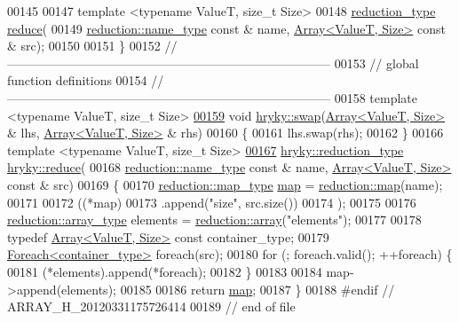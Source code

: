 \begin{DoxyCode}
00145 
00147     \textcolor{keyword}{template} <\textcolor{keyword}{typename} ValueT, \textcolor{keywordtype}{size\_t} Size>
00148     \hyperlink{classhryky_1_1_intrusive_ptr}{reduction_type} \hyperlink{namespacehryky_af41cb3af6766761da0ff21b84527a52c}{reduce}(
00149         \hyperlink{classhryky_1_1reduction_1_1_string}{reduction::name_type} \textcolor{keyword}{const} & name, \hyperlink{classhryky_1_1_array}{Array<ValueT, Size>} \textcolor{keyword}{const} & src);
00150 
00151 \}
00152 \textcolor{comment}{//
      ------------------------------------------------------------------------------}
00153 \textcolor{comment}{// global function definitions}
00154 \textcolor{comment}{//
      ------------------------------------------------------------------------------}
00158 \textcolor{comment}{}\textcolor{keyword}{template} <\textcolor{keyword}{typename} ValueT, \textcolor{keywordtype}{size\_t} Size>
\hypertarget{array_8h_source_l00159}{}\hyperlink{namespacehryky_a7bca9e1fce78881655d3c9e23dad3691}{00159} \textcolor{keywordtype}{void} \hyperlink{namespacehryky_a4282146df5ea2b68cb667896a2205909}{hryky::swap}(\hyperlink{classhryky_1_1_array}{Array<ValueT, Size>} & lhs, \hyperlink{classhryky_1_1_array}{Array<ValueT, Size>} & rhs)
00160 \{
00161     lhs.swap(rhs);
00162 \}
00166 \textcolor{keyword}{template} <\textcolor{keyword}{typename} ValueT, \textcolor{keywordtype}{size\_t} Size>
\hypertarget{array_8h_source_l00167}{}\hyperlink{namespacehryky_aa477737bab9053e12bd5640f91549b26}{00167} \hyperlink{classhryky_1_1_intrusive_ptr}{hryky::reduction_type} \hyperlink{namespacehryky_af41cb3af6766761da0ff21b84527a52c}{hryky::reduce}(
00168     \hyperlink{classhryky_1_1reduction_1_1_string}{reduction::name_type} \textcolor{keyword}{const} & name, \hyperlink{classhryky_1_1_array}{Array<ValueT, Size>} \textcolor{keyword}{const} & src)
00169 \{
00170     \hyperlink{classhryky_1_1_intrusive_ptr}{reduction::map_type} \hyperlink{namespacehryky_1_1reduction_ac5eae270cf8047b294dc4ff3e5e11a79}{map} = \hyperlink{namespacehryky_1_1reduction_ac5eae270cf8047b294dc4ff3e5e11a79}{reduction::map}(name);
00171 
00172     ((*map)
00173      .append(\textcolor{stringliteral}{"size"}, src.size())
00174      );
00175 
00176     \hyperlink{classhryky_1_1_intrusive_ptr}{reduction::array_type} elements = \hyperlink{namespacehryky_1_1reduction_a9d45a4dc1ea9a6668ebd192f296f788c}{reduction::array}(\textcolor{stringliteral}{"elements"});
00177 
00178     \textcolor{keyword}{typedef} \hyperlink{classhryky_1_1_array}{Array<ValueT, Size>} \textcolor{keyword}{const} container\_type;
00179     \hyperlink{classhryky_1_1_foreach}{Foreach<container_type>} \textcolor{keywordflow}{foreach}(src);
00180     \textcolor{keywordflow}{for} (; \textcolor{keywordflow}{foreach}.valid(); ++\textcolor{keywordflow}{foreach}) \{
00181         (*elements).append(*\textcolor{keywordflow}{foreach});
00182     \}
00183 
00184     map->append(elements);
00185     
00186     \textcolor{keywordflow}{return} \hyperlink{namespacehryky_1_1reduction_ac5eae270cf8047b294dc4ff3e5e11a79}{map};
00187 \}
00188 \textcolor{preprocessor}{#endif // ARRAY\_H\_20120331175726414}
00189 \textcolor{preprocessor}{}\textcolor{comment}{// end of file}
\end{DoxyCode}
